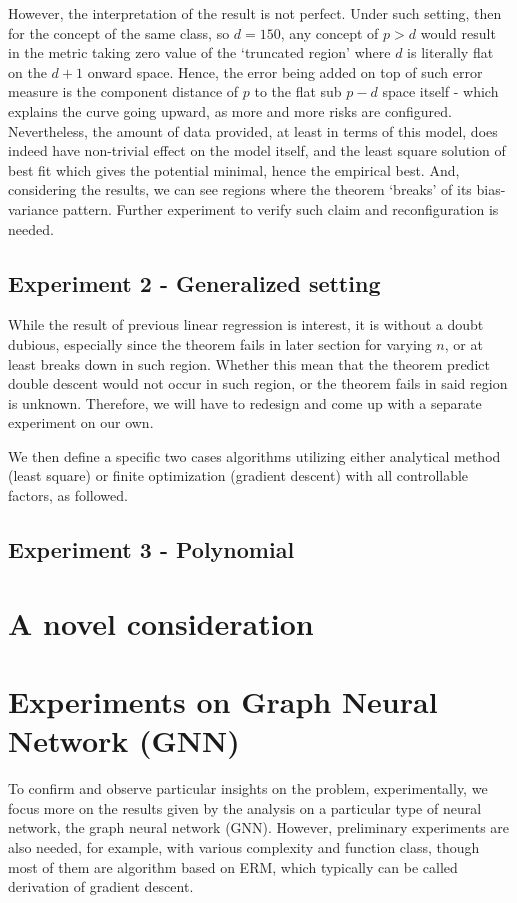\documentclass[10pt,oneside,oldfontcommands,dvipsnames,article]{memoir}
\begin{document}
However, the interpretation of the result is not perfect. Under such setting, then for the concept of the same class, so $d=150$, any concept of $p>d$ would result in the metric taking zero value of the `truncated region' where $d$ is literally flat on the $d+1$ onward space. Hence, the error being added on top of such error measure is the component distance of $p$ to the flat sub $p-d$ space itself - which explains the curve going upward, as more and more risks are configured. Nevertheless, the amount of data provided, at least in terms of this model, does indeed have non-trivial effect on the model itself, and the least square solution of best fit which gives the potential minimal, hence the empirical best. And, considering the results, we can see regions where the theorem `breaks' of its bias-variance pattern. Further experiment to verify such claim and reconfiguration is needed. 

\subsection{Experiment 2 - Generalized setting}
While the result of previous linear regression is interest, it is without a doubt dubious, especially since the theorem fails in later section for varying $n$, or at least breaks down in such region. Whether this mean that the theorem predict double descent would not occur in such region, or the theorem fails in said region is unknown. Therefore, we will have to redesign and come up with a separate experiment on our own. 

We then define a specific two cases algorithms utilizing either analytical method (least square) or finite optimization (gradient descent) with all controllable factors, as followed. 




\subsection{Experiment 3 - Polynomial}


\clearpage

\section{A novel consideration}


\clearpage 
\section{Experiments on Graph Neural Network (GNN)}
To confirm and observe particular insights on the problem, experimentally, we focus more on the results given by the analysis on a particular type of neural network, the graph neural network (GNN). However, preliminary experiments are also needed, for example, with various complexity and function class, though most of them are algorithm based on ERM, which typically can be called derivation of gradient descent. 
\end{document}
